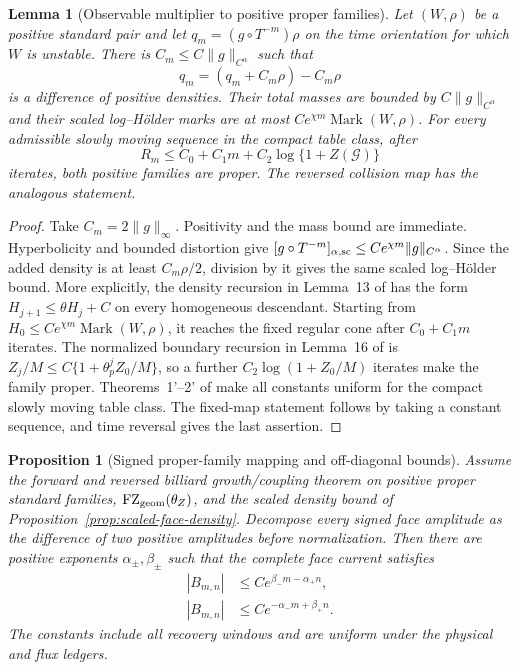 \documentclass[11pt]{article}
\newtheorem{proposition}[theorem]{Proposition}
\newtheorem{lemma}[theorem]{Lemma}
\begin{document}
\begin{lemma}[Observable multiplier to positive proper families]
\label{lem:signed-observable-multiplier}
Let $(W,\rho)$ be a positive standard pair and let
$q_m=(g\circ T^{-m})\rho$ on the time orientation for which $W$ is unstable.
There is $C_m\le C\|g\|_{C^\alpha}$ such that
\[
 q_m=(q_m+C_m\rho)-C_m\rho
\]
is a difference of positive densities.  Their total masses are bounded by
$C\|g\|_{C^\alpha}$ and their scaled log--H\"older marks are at most
$Ce^{\chi m}\operatorname{Mark}(W,\rho)$.  For every admissible slowly
moving sequence in the compact table class, after
\begin{equation}
\label{eq:multiplier-recovery-time}
 R_m\le C_0+C_1m+C_2\log\{1+Z(\mathcal G)\}
\end{equation}
iterates, both positive families are proper.  The reversed collision map has
the analogous statement.
\end{lemma}

\begin{proof}
Take $C_m=2\|g\|_\infty$.  Positivity and the mass bound are immediate.
Hyperbolicity and bounded distortion give
$[g\circ T^{-m}]_{\alpha,\rm sc}\le Ce^{\chi m}\|g\|_{C^\alpha}$.
Since the added density is at least $C_m\rho/2$, division by it gives the same
scaled log--H\"older bound.  More explicitly, the density recursion in
Lemma~13 of \cite{SYZ} has the form
$H_{j+1}\le\theta H_j+C$ on every homogeneous descendant.  Starting from
$H_0\le Ce^{\chi m}\operatorname{Mark}(W,\rho)$, it reaches the fixed regular
cone after $C_0+C_1m$ iterates.  The normalized boundary recursion in
Lemma~16 of \cite{SYZ} is
$Z_j/M\le C\{1+\theta_p^j Z_0/M\}$, so a further
$C_2\log(1+Z_0/M)$ iterates make the family proper.  Theorems~1'--2' of
\cite{SYZ} make all constants uniform for the compact slowly moving table
class.  The fixed-map statement follows by taking a constant sequence, and
time reversal gives the last assertion.
\end{proof}

\begin{proposition}[Signed proper-family mapping and off-diagonal bounds]
\label{prop:signed-off-diagonal-mapping}
Assume the forward and reversed billiard growth/coupling theorem on positive
proper standard families, $\mathrm{FZ}_{\rm geom}(\theta_Z)$, and the scaled density
bound of Proposition~\ref{prop:scaled-face-density}.  Decompose every signed
face amplitude as the difference of two positive amplitudes before
normalization.  Then there are positive exponents
$\alpha_\pm,\beta_\pm$ such that the complete face current satisfies
\begin{align}
 |B_{m,n}|&\le Ce^{\beta_-m-\alpha_+n},
 \label{eq:verified-forward-cone}\\
 |B_{m,n}|&\le Ce^{-\alpha_-m+\beta_+n}.
 \label{eq:verified-backward-cone}
\end{align}
The constants include all recovery windows and are uniform under the
physical and flux ledgers.
\end{proposition}
\end{document}
